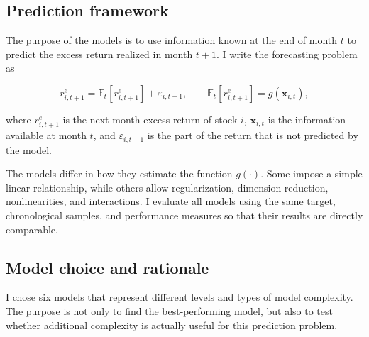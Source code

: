 \documentclass[11pt,a4paper]{article}
\begin{document}
\subsection{Prediction framework}

The purpose of the models is to use information known at the end of month
\(t\) to predict the excess return realized in month \(t+1\). I write the
forecasting problem as

\begin{equation}
 r^e_{i,t+1}
 =
 \mathbb{E}_t
 \left[
 r^e_{i,t+1}
 \right]
 +
 \varepsilon_{i,t+1},
 \qquad
 \mathbb{E}_t
 \left[
 r^e_{i,t+1}
 \right]
 =
 g(\mathbf{x}_{i,t}),
 \label{eq:framework}
\end{equation}

where \(r^e_{i,t+1}\) is the next-month excess return of stock \(i\),
\(\mathbf{x}_{i,t}\) is the information available at month \(t\), and
\(\varepsilon_{i,t+1}\) is the part of the return that is not predicted by the
model.

The models differ in how they estimate the function \(g(\cdot)\). Some impose a
simple linear relationship, while others allow regularization, dimension
reduction, nonlinearities, and interactions. I evaluate all models using the
same target, chronological samples, and performance measures so that their
results are directly comparable.

\subsection{Model choice and rationale}

I chose six models that represent different levels and types of model
complexity. The purpose is not only to find the best-performing model, but also
to test whether additional complexity is actually useful for this prediction
problem.
\end{document}
